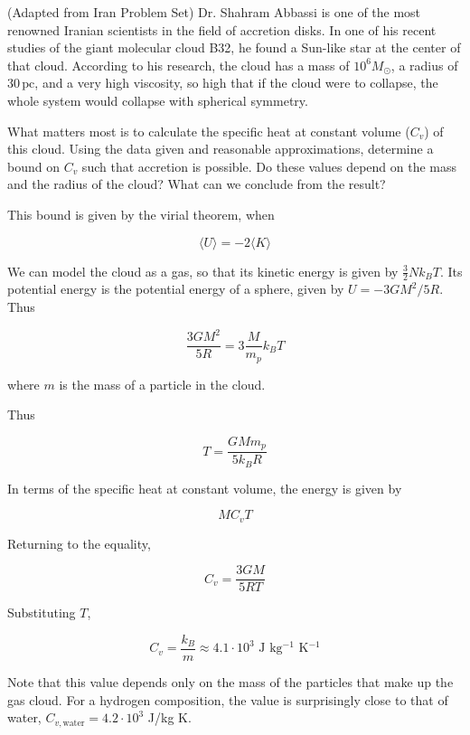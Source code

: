 \documentclass[11pt]{article}
\begin{document}
\begin{pproblem} (Adapted from Iran Problem Set)
    Dr. Shahram Abbassi is one of the most renowned Iranian scientists in the field of accretion disks. In one of his recent studies of the giant molecular cloud B32, he found a Sun-like star at the center of that cloud. According to his research, the cloud has a mass of $10^6 M_\odot$, a radius of $30 \, \text{pc}$, and a very high viscosity, so high that if the cloud were to collapse, the whole system would collapse with spherical symmetry.

    What matters most is to calculate the specific heat at constant volume ($C_v$) of this cloud. Using the data given and reasonable approximations, determine a bound on $C_v$ such that accretion is possible. Do these values depend on the mass and the radius of the cloud? What can we conclude from the result?
\begin{pssolution*}{}{}
    This bound is given by the virial theorem, when

    \[\langle U \rangle = -2 \langle K \rangle\]

    We can model the cloud as a gas, so that its kinetic energy is given by \(\frac{3}{2} N k_B T\). Its potential energy is the potential energy of a sphere, given by \(U = -3GM^2/5R\). Thus

    \[\frac{3GM^2}{5R} = 3\frac{M}{m_p}k_B T\]

    where \(m\) is the mass of a particle in the cloud.

    Thus

    \[T = \frac{GMm_p}{5k_B R}\]

    In terms of the specific heat at constant volume, the energy is given by

    \[M C_v T\]

    Returning to the equality,

    \[C_v = \frac{3GM}{5R T}\]

    Substituting \(T\),

    \[\boxed{C_v = \frac{k_B }{m} \approx 4.1 \cdot 10^3 \text{ J kg\(^{-1}\) K\(^{-1}\)}}\]

    Note that this value depends only on the mass of the particles that make up the gas cloud. For a hydrogen composition, the value is surprisingly close to that of water, \(C_{v, \text{water}} = 4.2\cdot 10^{3}\) J/kg K.
\end{pssolution*}
\end{pproblem}

\newpage
\end{document}
